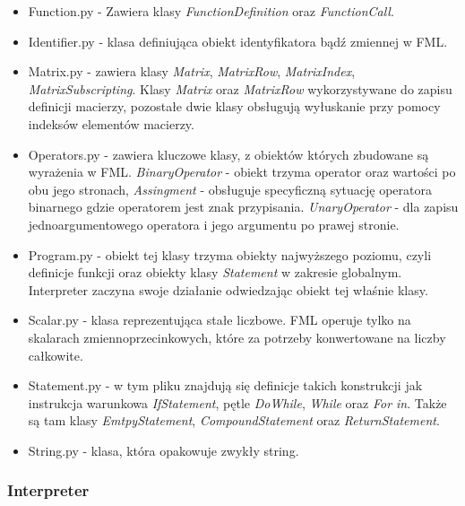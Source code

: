 \documentclass[12pt,a4paper]{article}
\begin{document}
\begin{itemize}

\item Function.py - Zawiera klasy \emph{FunctionDefinition} oraz \emph{FunctionCall}.

\item Identifier.py - klasa definiująca obiekt identyfikatora bądź zmiennej w FML.

\item Matrix.py - zawiera klasy \emph{Matrix}, \emph{MatrixRow}, \emph{MatrixIndex}, \emph{MatrixSubscripting}. Klasy \emph{Matrix} oraz \emph{MatrixRow} wykorzystywane do zapisu definicji macierzy, pozostałe dwie klasy obsługują wyłuskanie przy pomocy indeksów elementów macierzy. 

\item Operators.py - zawiera kluczowe klasy, z obiektów których zbudowane są wyrażenia w FML. \emph{BinaryOperator} - obiekt trzyma operator oraz wartości po obu jego stronach, \emph{Assingment} - obsługuje specyficzną sytuację operatora binarnego gdzie operatorem jest znak przypisania. \emph{UnaryOperator} - dla zapisu jednoargumentowego operatora i jego argumentu po prawej stronie. 

\item Program.py - obiekt tej klasy trzyma obiekty najwyższego poziomu, czyli definicje funkcji oraz obiekty klasy \emph{Statement} w zakresie globalnym. Interpreter zaczyna swoje działanie odwiedzając obiekt tej właśnie klasy.

\item Scalar.py - klasa reprezentująca stałe liczbowe. FML operuje tylko na skalarach zmiennoprzecinkowych, które za potrzeby konwertowane na liczby całkowite.

\item Statement.py - w tym pliku znajdują się definicje takich konstrukcji jak instrukcja warunkowa \emph{IfStatement}, pętle \emph{DoWhile}, \emph{While} oraz \emph{For in}. Także są tam klasy \emph{EmtpyStatement}, \emph{CompoundStatement} oraz \emph{ReturnStatement}.

\item String.py - klasa, która opakowuje zwykły string.

\end{itemize}

\subsubsection{Interpreter}
\end{document}
